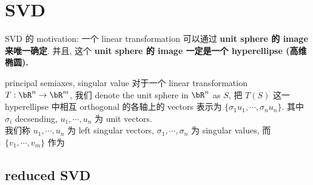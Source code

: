 \chapter{SVD}
SVD 的 motivation: 一个 linear transformation 可以通过 \textbf{unit sphere 的 image 来唯一确定}. 并且, 这个 \textbf{unit sphere 的 image 一定是一个 hyperellipse (高维椭圆).}

\begin{definition}{principal semiaxes, singular value}
对于一个 linear transformation $T: \bR^n \rar \bR^m$, 我们 denote the unit sphere in $\bR^n$ as $S$, 把 $T(S)$ 这一 hyperellipse 中相互 orthogonal 的各轴上的 vectors 表示为 $\{  \sigma_1 u_1, \cdots, \sigma_nu_n    \}$. 其中 $\sigma_i$ decsending, $u_1,\cdots,u_n$ 为 unit vectors. \\
我们称 $u_1,\cdots,u_n$  为 left singular vectors, $\sigma_1, \cdots, \sigma_n$ 为 singular values, 而 $\{v_1,\cdots,v_m\}$ 作为
    
\end{definition}


\section{reduced SVD}













